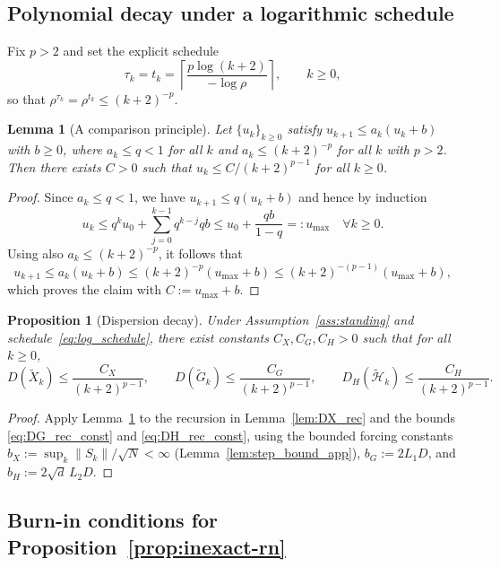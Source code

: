 \documentclass[11pt,a4paper]{article}
\newtheorem{lemma}[theorem]{Lemma}
\newtheorem{proposition}[theorem]{Proposition}
\begin{document}
\subsection{Polynomial decay under a logarithmic schedule}

Fix $p>2$ and set the explicit schedule
\begin{equation}\label{eq:log_schedule}
\tau_k=t_k=\left\lceil \frac{p\log(k+2)}{-\log\rho}\right\rceil,\qquad k\ge 0,
\end{equation}
so that $\rho^{\tau_k}=\rho^{t_k}\le (k+2)^{-p}$.

\begin{lemma}[A comparison principle]\label{lem:compare}
Let $\{u_k\}_{k\ge0}$ satisfy $u_{k+1}\le a_k(u_k+b)$ with $b\ge0$, where
$a_k\le q<1$ for all $k$ and $a_k\le (k+2)^{-p}$ for all $k$ with $p>2$.
Then there exists $C>0$ such that $u_k\le C/(k+2)^{p-1}$ for all $k\ge0$.
\end{lemma}
\begin{proof}
Since $a_k\le q<1$, we have $u_{k+1}\le q(u_k+b)$ and hence by induction
\[
u_k\le q^k u_0+\sum_{j=0}^{k-1} q^{k-j}qb \le u_0+\frac{qb}{1-q}=:u_{\max}\quad \forall k\ge 0.
\]
Using also $a_k\le (k+2)^{-p}$, it follows that
\[
u_{k+1}\le a_k(u_k+b)\le (k+2)^{-p}(u_{\max}+b)\le (k+2)^{-(p-1)}(u_{\max}+b),
\]
which proves the claim with $C:=u_{\max}+b$.
\end{proof}

\begin{proposition}[Dispersion decay]\label{prop:dispersion_decay}
Under Assumption~\ref{ass:standing} and schedule~\eqref{eq:log_schedule},
there exist constants $C_X,C_G,C_H>0$ such that for all $k\ge0$,
\[
D(\tilde X_k)\le \frac{C_X}{(k+2)^{p-1}},
\qquad
D(\tilde G_k)\le \frac{C_G}{(k+2)^{p-1}},
\qquad
D_H(\tilde{\mathcal H}_k)\le \frac{C_H}{(k+2)^{p-1}}.
\]
\end{proposition}
\begin{proof}
Apply Lemma~\ref{lem:compare} to the recursion in Lemma~\ref{lem:DX_rec} and the bounds \eqref{eq:DG_rec_const} and \eqref{eq:DH_rec_const},
using the bounded forcing constants $b_X:=\sup_k\|S_k\|/\sqrt N<\infty$ (Lemma~\ref{lem:step_bound_app}),
$b_G:=2L_1D$, and $b_H:=2\sqrt d\,L_2D$.
\end{proof}

\subsection{Burn-in conditions for Proposition~\ref{prop:inexact-rn}}
\end{document}

